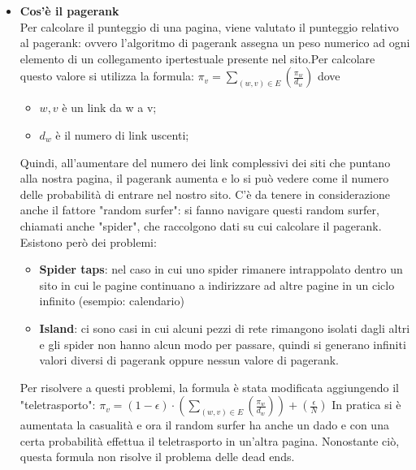 \documentclass[10pt,                    %
               a4paper,                 %
               twoside,                 %
               openright,               %
               english,                 
               italian,                 
]{article}
\begin{document}
\begin{itemize}
\item \textbf{Cos'è il pagerank} \\
Per calcolare il punteggio di una pagina, viene valutato il punteggio 
relativo al pagerank: ovvero l'algoritmo di pagerank assegna un peso numerico ad 
ogni elemento di un collegamento ipertestuale presente nel sito.Per calcolare 
questo valore si utilizza la formula: $\pi_{v}=\sum_{(w,v)\in E} 
\left(\frac{\pi_{w}}{d_{w}}\right)$ dove
\begin{itemize}
\item $w,v$ è un link da w a v;
\item $d_{w}$ è il numero di link uscenti;
\end{itemize}
Quindi, all'aumentare del numero dei link complessivi dei siti che puntano alla 
nostra pagina, il pagerank aumenta e lo si può vedere come il numero delle
probabilità di entrare nel nostro sito. C'è da tenere in considerazione anche
il fattore "random surfer": si fanno navigare questi random surfer, chiamati anche
"spider", che raccolgono dati su cui calcolare il pagerank. Esistono però dei problemi:
\begin{itemize}
\item \textbf{Spider taps}: nel caso in cui uno spider rimanere intrappolato dentro un
sito in cui le pagine continuano a indirizzare ad altre pagine in un ciclo infinito 
(esempio: calendario)
\item \textbf{Island}: ci sono casi in cui alcuni pezzi di rete rimangono isolati dagli 
altri e gli spider non hanno alcun modo per passare, quindi si generano infiniti valori 
diversi di pagerank oppure nessun valore di pagerank.
\end{itemize}
Per risolvere a questi problemi, la formula è stata modificata aggiungendo il "teletrasporto":
$\pi_{v}=(1- \epsilon)\cdot(\sum_{(w,v)\in E}\left(\frac{\pi_{w}}{d_{w}}\right))+ \left(\frac{\epsilon}{N}\right) $
In pratica si è aumentata la casualità e ora il random surfer ha anche un dado e con
una certa probabilità effettua il teletrasporto in un'altra pagina.
Nonostante ciò, questa formula non risolve il problema delle dead ends.


\end{itemize}
\end{document}
